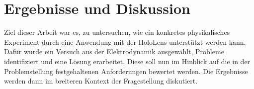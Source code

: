 \section{Ergebnisse und Diskussion}
\label{sec-6}
Ziel dieser Arbeit war es, zu untersuchen, wie ein konkretes physikalisches Experiment durch eine Anwendung mit der HoloLens unterstützt werden kann. Dafür wurde ein Versuch aus der Elektrodynamik ausgewählt, Probleme identifiziert und eine Lösung erarbeitet. Diese soll nun im Hinblick auf die in der Problemstellung festgehaltenen Anforderungen bewertet werden. Die Ergebnisse werden dann im breiteren Kontext der Fragestellung diskutiert.\\


\begin{comment}

\begin{itemize}
\item Welche physikalischen Zusammenhänge werden vermittelt?
\item Wie 
\end{itemize}

Konkrete untergeordnete Frage:
\begin{center}
\textit{\textbf{Wie kann die HoloLens in einem konkreten Anwendungsfall eines physikalischen Versuches genutzt werden?}}
\end{center}
\subsection{Aufgabenstellung}

Im Rahmen der Arbeit soll anhand der HoloLens untersucht werden, wie diese in der Physik-Lehre eingesetzt werden kann, um physikalische Inhalte zu vermitteln. Insbesondere soll betrachtet werden, wie physikalische Experimente mittels Mixed Reality Anwendungen durch zusätzliche Inhalte angereichert werden können.\\

\par
Dazu sind zunächst die technischen Möglichkeiten und Voraussetzungen der HoloLens zu betrachten und in Zusammenhang mit dem Anwendungsfall zu bringen. Weiterhin sind bestehende Ansätze im Einsatz von Mixed Reality Technologie in der Lehre, besonders in der Physik-Lehre, herauszuarbeiten und einzuordnen.

Davon ausgehend soll der Fragestellung anhand eines konkreten Beispiels nachgegangen werden. Für einen ausgewählten Versuchsaufbau sind die darzustellenden Objekte und Informationen sowie das Zusammenspiel dieser mit dem aufgebauten Experiment, der Umgebung und den Nutzern zu entwickeln. Für den ausgewählten Anwendungsfall soll eine Umsetzung mit der HoloLens konzipiert, designet und prototypisch implementiert werden.
\end{comment}

